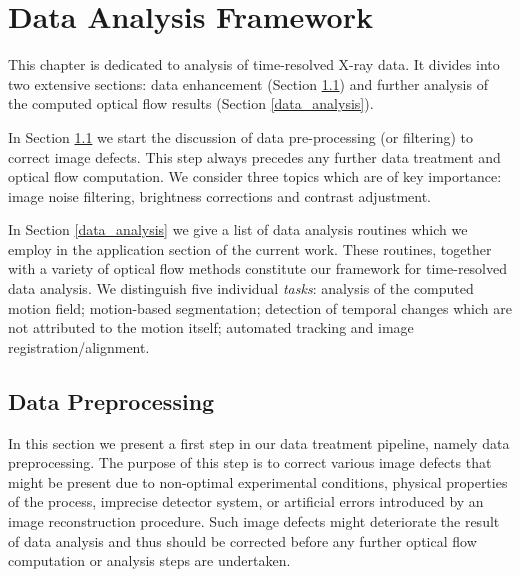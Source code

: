 \chapter {Data Analysis Framework}
\label{data_preprocessing}

This chapter is dedicated to analysis of time-resolved X-ray data. It divides into two extensive sections: data enhancement (Section \ref{data_processing}) and further analysis of the computed optical flow results (Section \ref{data_analysis}).
 
In Section \ref{data_processing} we start the discussion of data pre-processing (or filtering) to correct image defects. This step always precedes any further data treatment and optical flow computation. We consider three topics which are of key importance: image noise filtering, brightness corrections and contrast adjustment.     

In Section \ref{data_analysis} we give a list of data analysis routines which we employ in the application section of the current work. These routines, together with a variety of optical flow methods constitute our framework for time-resolved data analysis. We distinguish five individual \textit{tasks}: analysis of the computed motion field; motion-based segmentation; detection of temporal changes which are not attributed to the motion itself; automated tracking and image registration/alignment.

 

\section{Data Preprocessing}
\label{data_processing}

In this section we present a first step in our data treatment pipeline, namely data preprocessing. The purpose of this step is to correct various image defects that might be present due to  non-optimal experimental conditions, physical properties of the process, imprecise detector system, or  artificial errors introduced by an image reconstruction procedure. Such image defects might deteriorate the result of data analysis and thus should be corrected before any further optical flow computation or analysis steps are undertaken.

